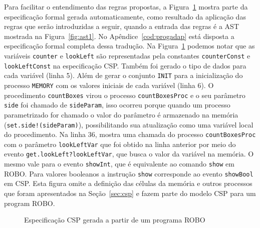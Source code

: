 Para facilitar o entendimento das regras propostas, a Figura~\ref{fig:progcsp} mostra parte da especificação formal gerada automaticamente, como resultado da aplicação das regras que serão introduzidas a seguir, quando a entrada das regras é a AST mostrada na Figura~\ref{fig:ast1}. No Apêndice~\ref{cod:progadap} está disposta a especificação formal completa dessa tradução.
Na Figura~\ref{fig:progcsp} podemos notar que as variáveis \texttt{counter} e \texttt{lookLeft} são representadas pela constantes \texttt{counterConst} e \texttt{lookLeftConst} na especificação CSP. Também foi gerado o tipo de dados para cada variável (linha 5). Além de gerar o conjunto \texttt{INIT} para a inicialização do processo \texttt{MEMORY} com os valores iniciais de cada variável (linha 6). O procedimento \texttt{countBoxes} virou o processo \texttt{countBoxesProc} e o seu parâmetro \texttt{side} foi chamado de \texttt{sideParam}, isso ocorreu porque quando um processo parametrizado for chamado o valor do parâmetro é armazenado na memória (\texttt{set.side!(sideParam)}), possibilitando sua atualização como uma variável local do procedimento. Na linha 36, mostra uma chamada do processo \texttt{countBoxesProc} com o parâmetro \texttt{lookLeftVar} que foi obtido na linha anterior por meio do evento \texttt{get.lookLeft?lookLeftVar}, que busca o valor da variável na memória. O mesmo vale para o evento \texttt{showInt}, que é equivalente ao comando \texttt{show} em ROBO. Para valores booleanos a instrução \texttt{show} corresponde ao evento \texttt{showBool} em CSP. Esta figura omite a definição das células da memória e outros processos que foram apresentados na Seção~\ref{sec:csp} e fazem parte do modelo CSP para um program ROBO.  

\begin{figure}[!h]
\centering
\caption{Especificação CSP gerada a partir de um programa ROBO}

\label{fig:progcsp}
\end{figure}

